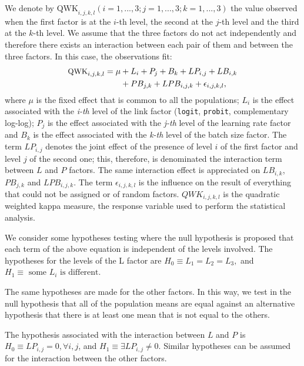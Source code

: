\documentclass[journal]{IEEEtran}
\begin{document}
	We denote by $\text{QWK}_{i,j,k,l}(i=1, ..., 3; j = 1, ..., 3; k = 1, ..., 3)$ the value observed when the first factor is at the $i$-th level, the second at the $j$-th level and the third at the $k$-th level. We assume that the three factors do not act independently and therefore there exists an interaction between each pair of them and between the three factors. In this case, the observations fit:
	\begin{equation}
	\begin{aligned}
	\footnotesize
	\text{QWK}_{i,j,k,l} = \mu & + L_i + P_j + B_k + LP_{i,j} + LB_{i,k} \\& + PB_{j,k} + LPB_{i,j,k} + \epsilon_{i,j,k,l},
	\label{eq:anova3}
	\end{aligned}
	\end{equation}
	where $\mu$ is the fixed effect that is common to all the populations; $L_i$ is the effect associated with the \textit{i-th} level of the link factor (\texttt{logit}, \texttt{probit}, complementary log-log); $P_j$ is the effect associated with the \textit{j-th} level of the learning rate factor and $B_k$ is the effect associated with the \textit{k-th} level of the batch size factor. The term $LP_{i,j}$ denotes the joint effect of the presence of level $i$ of the first factor and level $j$ of the second one; this, therefore, is denominated the interaction term between $L$ and $P$ factors. The same interaction effect is appreciated on $LB_{i,k}$, $PB_{j,k}$ and $LPB_{i,j,k}$. The term $\epsilon_{i,j,k,l}$ is the influence on the result of everything that could not be assigned or of random factors. $QWK_{i,j,k,l}$ is the quadratic weighted kappa measure, the response variable used to perform the statistical analysis.
	
	We consider some hypotheses testing where the null hypothesis is proposed that each term of the above equation is independent of the levels involved. The hypotheses for the levels of the L factor are $H_0 \equiv L_1 = L_2 = L_3,$ and $H_1 \equiv \text{ some } L_i \text{ is different}$.
	
	The same hypotheses are made for the other factors. In this way, we test in the null hypothesis that all of the population means are equal against an alternative hypothesis that there is at least one mean that is not equal to the others.
	
	The hypothesis associated with the interaction between $L$ and $P$ is $H_0 \equiv LP_{i,j} = 0, \forall i,j$, and $H_1 \equiv \exists LP_{i,j} \ne 0$. Similar hypotheses can be assumed for the interaction between the other factors.
	
\end{document}
